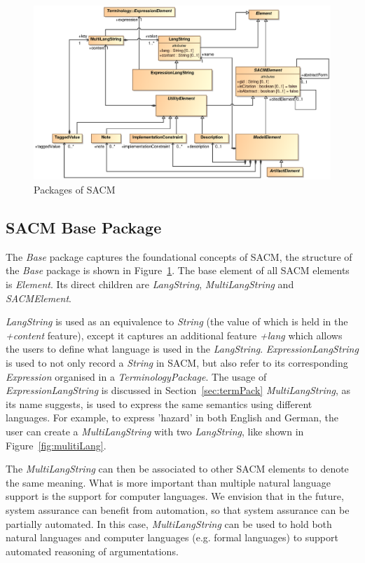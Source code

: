 \begin{figure}
	\centering
	\includegraphics[width=1\linewidth]{fig/Base.eps}
	\caption{Packages of SACM}
	\label{fig:base}
\end{figure}


\subsection{SACM Base Package}
\label{sec:basePack}
The \textit{Base} package captures the foundational concepts of SACM, the structure of the \textit{Base} package is shown in Figure~\ref{fig:base}. The base element of all SACM elements is \textit{Element}. Its direct children are \textit{LangString}, \textit{MultiLangString} and \textit{SACMElement}.

\textit{LangString} is used as an equivalence to \textit{String} (the value of which is held in the \textit{+content} feature), except it captures an additional feature \textit{+lang} which allows the users to define what language is used in the \textit{LangString}. \textit{ExpressionLangString} is used to not only record a \textit{String} in SACM, but also refer to its corresponding \textit{Expression} organised in a \textit{TerminologyPackage}. The usage of \textit{ExpressionLangString} is discussed in Section~\ref{sec:termPack} \textit{MultiLangString}, as its name suggests, is used to express the same semantics using different languages. For example, to express 'hazard' in both English and German, the user can create a \textit{MultiLangString} with two \textit{LangString}, like shown in Figure~\ref{fig:mulitiLang}.

The \textit{MultiLangString} can then be associated to other SACM elements to denote the same meaning. What is more important than multiple natural language support is the support for computer languages. We envision that in the future, system assurance can benefit from automation, so that system assurance can be partially automated. In this case, \textit{MultiLangString} can be used to hold both natural languages and computer languages (e.g. formal languages) to support automated reasoning of argumentations. 

